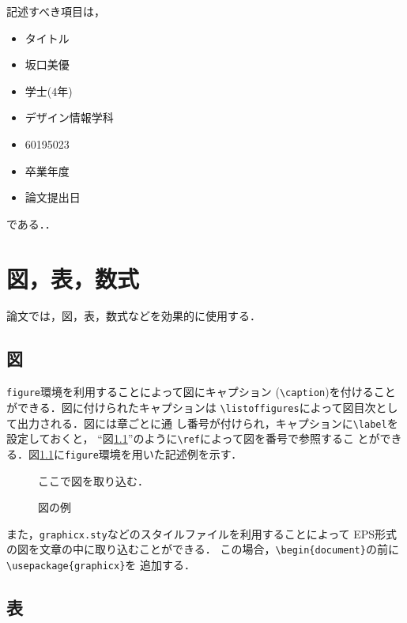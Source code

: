 \documentclass[11pt]{jreport}
\begin{document}
記述すべき項目は，
\begin{itemize}
  \item タイトル
  \item 坂口美優
  \item 学士(4年)
  \item デザイン情報学科
  \item 60195023
  \item 卒業年度
  \item 論文提出日
\end{itemize}
である．．


\chapter{図，表，数式}\label{chap:fig-tab-exp}

論文では，図，表，数式などを効果的に使用する．

\section{図}

{\tt figure}環境を利用することによって図にキャプション
(\verb|\caption|)を付けることができる．図に付けられたキャプションは
\verb|\listoffigures|によって図目次として出力される．図には章ごとに通
し番号が付けられ，キャプションに\verb|\label|を設定しておくと，
``図\ref{fig:sample}''のように\verb|\ref|によって図を番号で参照するこ
とができる．図\ref{fig:sample}に{\tt figure}環境を用いた記述例を示す．

\begin{figure}
  \begin{center}
    ここで図を取り込む．
  \end{center}
  \caption{図の例}
  \label{fig:sample}
\end{figure}

また，{\tt graphicx.sty}などのスタイルファイルを利用することによって
EPS形式の図を文章の中に取り込むことができる．
この場合，\verb|\begin{document}|の前に\verb|\usepackage{graphicx}|を
追加する．

\section{表}
\end{document}
